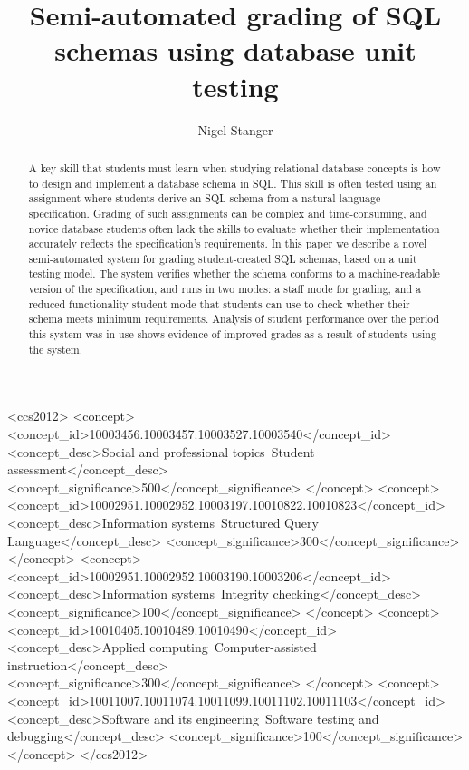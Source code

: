 \documentclass[sigconf, review, anonymous, capitalise]{acmart}
\title{Semi-automated grading of SQL \\ schemas using database unit testing}
\author{Nigel Stanger}
\affiliation{
    \institution{University of Otago}
    \department{Department of Information Science}
    \city{Dunedin}
    \country{New Zealand}
}
\begin{document}
\begin{abstract}
    A key skill that students must learn when studying relational database concepts is how to design and implement a database schema in SQL. This skill is often tested using an assignment where students derive an SQL schema from a natural language specification. Grading of such assignments can be complex and time-consuming, and novice database students often lack the skills to evaluate whether their implementation accurately reflects the specification's requirements. In this paper we describe a novel semi-automated system for grading student-created SQL schemas, based on a unit testing model. The system verifies whether the schema conforms to a machine-readable version of the specification, and runs in two modes: a staff mode for grading, and a reduced functionality student mode that students can use to check whether their schema meets minimum requirements. Analysis of student performance over the period this system was in use shows evidence of improved grades as a result of students using the system.
\end{abstract}

\begin{CCSXML}
<ccs2012>
<concept>
<concept_id>10003456.10003457.10003527.10003540</concept_id>
<concept_desc>Social and professional topics~Student assessment</concept_desc>
<concept_significance>500</concept_significance>
</concept>
<concept>
<concept_id>10002951.10002952.10003197.10010822.10010823</concept_id>
<concept_desc>Information systems~Structured Query Language</concept_desc>
<concept_significance>300</concept_significance>
</concept>
<concept>
<concept_id>10002951.10002952.10003190.10003206</concept_id>
<concept_desc>Information systems~Integrity checking</concept_desc>
<concept_significance>100</concept_significance>
</concept>
<concept>
<concept_id>10010405.10010489.10010490</concept_id>
<concept_desc>Applied computing~Computer-assisted instruction</concept_desc>
<concept_significance>300</concept_significance>
</concept>
<concept>
<concept_id>10011007.10011074.10011099.10011102.10011103</concept_id>
<concept_desc>Software and its engineering~Software testing and debugging</concept_desc>
<concept_significance>100</concept_significance>
</concept>
</ccs2012>
\end{CCSXML}

\end{document}
